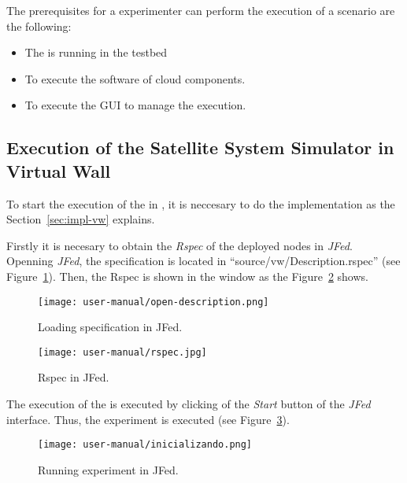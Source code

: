 The prerequisites for a experimenter can perform the execution of a scenario are
the following:
\begin{itemize}
\item The \sss is running in the \vw testbed
\item To execute the software of cloud components. 
\item To execute the \ac{GUI} to manage the execution.
\end{itemize}

\subsection{Execution of the Satellite System Simulator in Virtual Wall}

To start the execution of the \sss in \vw, it is neccesary to do the
implementation as the Section~\ref{sec:impl-vw} explains.

Firstly it is necesary to obtain the \emph{Rspec} of the deployed nodes in
\emph{JFed}. Openning \emph{JFed}, the specification is located in
``source/vw/Description.rspec'' (see Figure~\ref{fig:loading-rspec}). Then, the Rspec is shown in
the window as the Figure~\ref{fig:rspec} shows.

\begin{figure}[!h]
\begin{center}
\texttt{[image: user-manual/open-description.png]}
\caption{Loading specification in JFed.}
\label{fig:loading-rspec}
\end{center}
\end{figure}


\begin{figure}[!h]
\begin{center}
\texttt{[image: user-manual/rspec.jpg]}
\caption{Rspec in JFed.}
\label{fig:rspec}
\end{center}
\end{figure}


The execution of the \sss is executed by clicking of the \emph{Start} button of
the \emph{JFed} interface. Thus, the experiment is executed (see Figure~\ref{fig:running-jfed}).

\begin{figure}[!h]
\begin{center}
\texttt{[image: user-manual/inicializando.png]}
\caption{Running experiment in JFed.}
\label{fig:running-jfed}
\end{center}
\end{figure}

